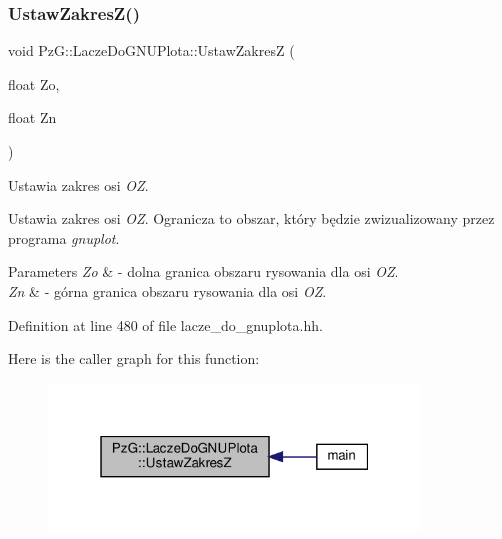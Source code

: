 \subsubsection{\texorpdfstring{Ustaw\+Zakres\+Z()}{UstawZakresZ()}}
{\footnotesize\ttfamily void Pz\+G\+::\+Lacze\+Do\+G\+N\+U\+Plota\+::\+Ustaw\+ZakresZ (\begin{DoxyParamCaption}\item[{float}]{Zo,  }\item[{float}]{Zn }\end{DoxyParamCaption})\hspace{0.3cm}{\ttfamily [inline]}}



Ustawia zakres osi {\itshape OZ}. 

Ustawia zakres osi {\itshape OZ}. Ogranicza to obszar, który będzie zwizualizowany przez programa {\itshape gnuplot}. 
\begin{DoxyParams}{Parameters}
{\em Zo} & -\/ dolna granica obszaru rysowania dla osi {\itshape OZ}. \\
\hline
{\em Zn} & -\/ górna granica obszaru rysowania dla osi {\itshape OZ}. \\
\hline
\end{DoxyParams}


Definition at line 480 of file lacze\+\_\+do\+\_\+gnuplota.\+hh.

Here is the caller graph for this function\+:\nopagebreak
\begin{figure}[H]
\begin{center}
\leavevmode
\includegraphics[width=280pt]{class_pz_g_1_1_lacze_do_g_n_u_plota_a1dbbb2b86fb13b8632e6bad9df2a82e3_icgraph}
\end{center}
\end{figure}
\mbox{\label{class_pz_g_1_1_lacze_do_g_n_u_plota_a75f599f17413ea8602c6dbba09f36407}} 
